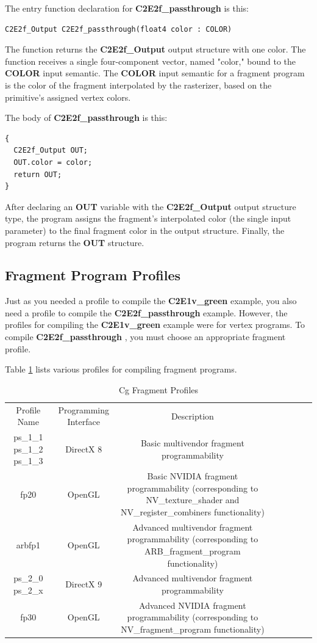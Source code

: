 \documentclass{book}
\begin{document}
The entry function declaration for \textbf{C2E2f_passthrough} is this:

\FloatBarrier
\begin{lstlisting}
C2E2f_Output C2E2f_passthrough(float4 color : COLOR)
\end{lstlisting}
\FloatBarrier

The function returns the \textbf{C2E2f_Output} output structure with one color. The function receives a single four-component vector, named "color," bound to the \textbf{COLOR} input semantic. The \textbf{COLOR} input semantic for a fragment program is the color of the fragment interpolated by the rasterizer, based on the primitive's assigned vertex colors.

The body of \textbf{C2E2f_passthrough} is this:

\FloatBarrier
\begin{lstlisting}
{
  C2E2f_Output OUT;
  OUT.color = color;
  return OUT;
}
\end{lstlisting}
\FloatBarrier

After declaring an \textbf{OUT} variable with the \textbf{C2E2f_Output} output structure type, the program assigns the fragment's interpolated color (the single input parameter) to the final fragment color in the output structure. Finally, the program returns the \textbf{OUT} structure.

\subsection{Fragment Program Profiles}

Just as you needed a profile to compile the \textbf{C2E1v_green} example, you also need a profile to compile the \textbf{C2E2f_passthrough} example. However, the profiles for compiling the \textbf{C2E1v_green} example were for vertex programs. To compile \textbf{C2E2f_passthrough} , you must choose an appropriate fragment profile.

Table \ref{table:2-2} lists various profiles for compiling fragment programs.

\begin{table}
\centering
\begin{tabular}{ |c|c|c|c|c|c|c|c| } 
 \hline
Profile Name & Programming Interface & Description \\
ps_1_1 ps_1_2 ps_1_3 & DirectX 8 & Basic multivendor fragment programmability \\
fp20 & OpenGL & Basic NVIDIA fragment programmability (corresponding to NV_texture_shader and NV_register_combiners functionality) \\
arbfp1 & OpenGL & Advanced multivendor fragment programmability (corresponding to ARB_fragment_program functionality) \\
ps_2_0 ps_2_x & DirectX 9 & Advanced multivendor fragment programmability \\
fp30 & OpenGL & Advanced NVIDIA fragment programmability (corresponding to NV_fragment_program functionality) \\
 \hline
\end{tabular}
\caption{Cg Fragment Profiles}
\label{table:2-2}
\end{table}
\end{document}
